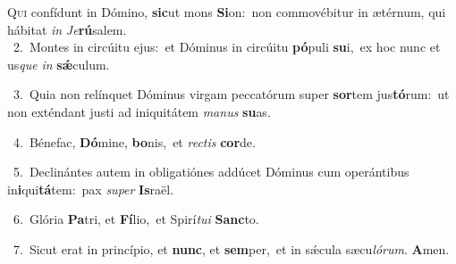 \lettrine{\initial\textcolor{\initialcolor}{Q}}{ui} confídunt in Dómino, \textbf{sic}\-ut mons \textbf{Si}\-on:~\star non commovébitur in ætérnum, qui hábitat \textit{in} \textit{Je}\-\textbf{rú}salem.\\
{\numbfont\textcolor{\numbcolor}{~2.}}~Montes in circúitu ejus:~\dagger et Dóminus in circúitu \textbf{pó}\-puli \textbf{su}\-i,~\star ex hoc nunc et us\textit{que} \textit{in} \textbf{sǽ}\-culum.\par
{\numbfont\textcolor{\numbcolor}{~3.}}~Quia non relínquet Dóminus virgam peccatórum super \textbf{sor}\-tem jus\-\textbf{tó}\-rum:~\star ut non exténdant justi ad iniquitátem \textit{ma}\-\textit{nus} \textbf{su}\-as.\par
{\numbfont\textcolor{\numbcolor}{~4.}}~Bénefac, \textbf{Dó}\-mine, \textbf{bo}\-nis,~\star et \textit{rec}\-\textit{tis} \textbf{cor}\-de.\par
{\numbfont\textcolor{\numbcolor}{~5.}}~Declinántes autem in obligatiónes addúcet Dóminus cum operántibus in\-\textbf{i}\-qui\-\textbf{tá}\-tem:~\star pax \textit{su}\-\textit{per} \textbf{Is}\-raël.\par
{\numbfont\textcolor{\numbcolor}{~6.}}~Glória \textbf{Pa}\-tri, et \textbf{Fí}\-lio,~\star et Spirí\-\textit{tu}\-\textit{i} \textbf{Sanc}\-to.\par
{\numbfont\textcolor{\numbcolor}{~7.}}~Sicut erat in princípio, et \textbf{nunc}\-, et \textbf{sem}\-per,~\star et in sǽcula sæcu\-\textit{ló}\-\textit{rum}. \textbf{A}\-men.\par
